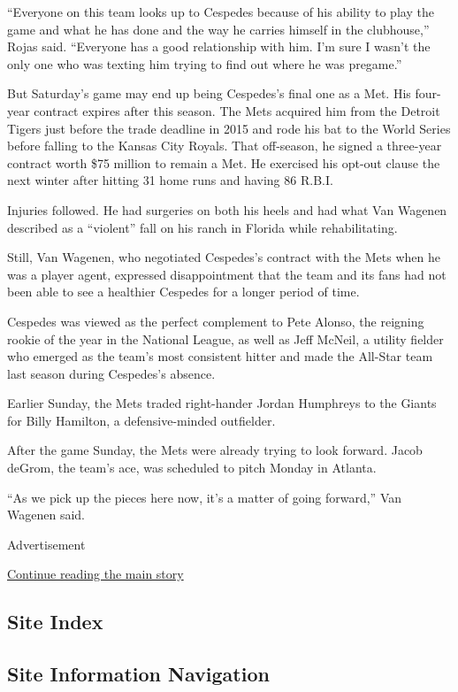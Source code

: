 ``Everyone on this team looks up to Cespedes because of his ability to
play the game and what he has done and the way he carries himself in the
clubhouse,'' Rojas said. ``Everyone has a good relationship with him.
I'm sure I wasn't the only one who was texting him trying to find out
where he was pregame.''

But Saturday's game may end up being Cespedes's final one as a Met. His
four-year contract expires after this season. The Mets acquired him from
the Detroit Tigers just before the trade deadline in 2015 and rode his
bat to the World Series before falling to the Kansas City Royals. That
off-season, he signed a three-year contract worth \$75 million to remain
a Met. He exercised his opt-out clause the next winter after hitting 31
home runs and having 86 R.B.I.

Injuries followed. He had surgeries on both his heels and had what Van
Wagenen described as a ``violent'' fall on his ranch in Florida while
rehabilitating.

Still, Van Wagenen, who negotiated Cespedes's contract with the Mets
when he was a player agent, expressed disappointment that the team and
its fans had not been able to see a healthier Cespedes for a longer
period of time.

Cespedes was viewed as the perfect complement to Pete Alonso, the
reigning rookie of the year in the National League, as well as Jeff
McNeil, a utility fielder who emerged as the team's most consistent
hitter and made the All-Star team last season during Cespedes's absence.

Earlier Sunday, the Mets traded right-hander Jordan Humphreys to the
Giants for Billy Hamilton, a defensive-minded outfielder.

After the game Sunday, the Mets were already trying to look forward.
Jacob deGrom, the team's ace, was scheduled to pitch Monday in Atlanta.

``As we pick up the pieces here now, it's a matter of going forward,''
Van Wagenen said.

Advertisement

\protect\hyperlink{after-bottom}{Continue reading the main story}

\hypertarget{site-index}{%
\subsection{Site Index}\label{site-index}}

\hypertarget{site-information-navigation}{%
\subsection{Site Information
Navigation}\label{site-information-navigation}}

